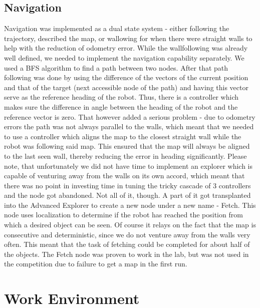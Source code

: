 \documentclass[10pt,a4paper,twocolumn]{article}
\begin{document}
\subsection{Navigation}
Navigation was implemented as a dual state system - either following the trajectory, described the map, or wallowing for when there were straight walls to help with the reduction of odometry error. While the wallfollowing was already well defined, we needed to implement the navigation capability separately. We used a BFS algorithm to find a path between two nodes. After that path following was done by using the difference of the vectors of the current position and that of the target (next accessible node of the path) and having this vector serve as the reference heading of the robot. Thus, there is a controller which makes sure the difference in angle between the heading of the robot and the reference vector is zero. That however added a serious problem - due to odometry errors the path was not always parallel to the walls, which meant that we needed to use a controller which aligns the map to the closest straight wall while the robot was following said map. This ensured that the map will always be aligned to the last seen wall, thereby reducing the error in heading significantly. Please note, that unfortunately we did not have time to implement an explorer which is capable of venturing away from the walls on its own accord, which meant that there was no point in investing time in tuning the tricky cascade of 3 controllers and the node got abandoned. 
Not all of it, though. A part of it got transplanted into the Advanced Explorer to create a new node under a new name - Fetch. This node uses localization to determine if the robot has reached the position from which a desired object can be seen. Of course it relays on the fact that the map is consecutive and deterministic, since we do not venture away from the walls very often. This meant that the task of fetching could be completed for about half of the objects. The Fetch node was proven to work in the lab, but was not used in the competition due to failure to get a map in the first run.   


\section{Work Environment}
\end{document}
